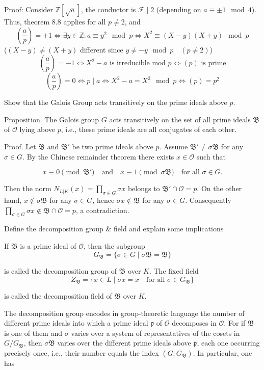 Proof: 
Consider \( \mathbb{Z}[\sqrt{a}] \), the conductor is \( \mathcal{F} \mid 2 \) (depending on \( a \equiv \pm1 \mod 4 \)). 
Thus, theorem 8.8 applies for all \( p \neq 2 \), and
\[
\left( \frac{a}{p} \right) = +1 \iff \exists y \in \mathbb{Z} : a \equiv y^2 \mod p \iff X^2 \equiv (X-y)(X+y) \mod p
\]
(\( (X-y) \neq (X+y) \) different since \( y \neq -y \mod p \quad (p \neq 2) \))
\[
\left( \frac{a}{p} \right) = -1 \iff X^2-a \text{ is irreducible mod } p \iff (p) \text{ is prime}
\]
\[
\left( \frac{a}{p} \right) = 0 \iff p \mid a \iff X^2-a = X^2 \mod p \iff (p) = p^2
\]


Show that the Galois Group acts transitively on the prime ideals above \( p \).

Proposition. 
The Galois group \( G \) acts transitively on the set of all prime ideals \(\mathfrak{B}\) of \(\mathcal{O}\) lying above \( p \), i.e., 
these prime ideals are all conjugates of each other.

Proof.
Let \(\mathfrak{B}\) and \(\mathfrak{B}'\) be two prime ideals above \( p \). Assume \(\mathfrak{B}' \neq \sigma \mathfrak{B}\) 
for any \(\sigma \in G\). By the Chinese remainder theorem there exists \( x \in \mathcal{O} \) such that 

\[
x \equiv 0 \pmod{\mathfrak{B}'} \quad \text{and} \quad x \equiv 1 \pmod{\sigma \mathfrak{B}} \quad \text{for all } \sigma \in G.
\]

Then the norm \( N_{L|K}(x) = \prod_{\sigma \in G} \sigma x \) belongs to \(\mathfrak{B}' \cap \mathcal{O} = p\). 
On the other hand, \( x \not\in \sigma \mathfrak{B} \) for any \(\sigma \in G\), hence \(\sigma x \not\in \mathfrak{B}\) 
for any \(\sigma \in G\). Consequently \(\prod_{\sigma \in G} \sigma x \not\in \mathfrak{B} \cap \mathcal{O} = p\), a contradiction.



Define the decomposition group \& field and explain some implications 

If \(\mathfrak{B}\) is a prime ideal of \(\mathcal{O}\), then the subgroup 
\[
G_{\mathfrak{B}} = \{ \sigma \in G \mid \sigma \mathfrak{B} = \mathfrak{B} \}
\]

is called the decomposition group of \(\mathfrak{B}\) over \(K\). The fixed field
\[
Z_{\mathfrak{B}} = \{ x \in L \mid \sigma x = x \quad \text{for all } \sigma \in G_{\mathfrak{B}} \}
\]

is called the decomposition field of \(\mathfrak{B}\) over \(K\).

The decomposition group encodes in group-theoretic language the number of different prime ideals into which a prime ideal \(\mathfrak{p}\) of 
\(\mathcal{O}\) decomposes in \(\mathcal{O}\). 
For if \(\mathfrak{B}\) is one of them and \(\sigma\) varies over a system of representatives of the cosets in \(G / G_{\mathfrak{B}}\), 
then \(\sigma \mathfrak{B}\) varies over the different prime ideals above \(\mathfrak{p}\), each one occurring precisely once, 
i.e., their number equals the index \((G : G_{\mathfrak{B}})\). In particular, one has

